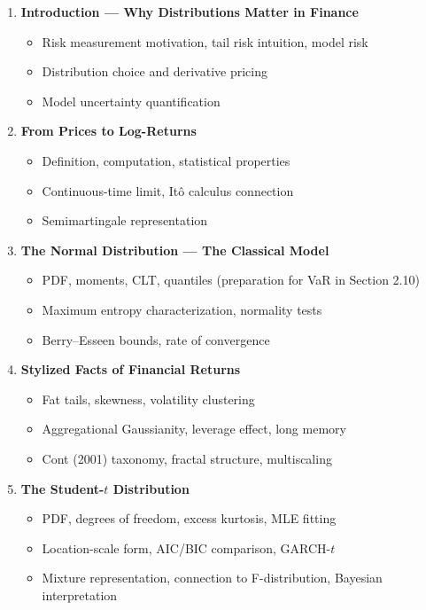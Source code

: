 \documentclass[11pt, a4paper]{article}
\newcommand{\layerY}[1]{\textcolor{MainBlue}{\textbf{[Y3]}} #1}
\newcommand{\layerM}[1]{\textcolor{Forest}{\textbf{[MSc]}} #1}
\newcommand{\layerP}[1]{\textcolor{Purple}{\textbf{[PhD]}} #1}
\theoremstyle{definition}
\begin{document}
\begin{enumerate}[label=\textbf{2.\arabic*}, leftmargin=2cm]

\item \textbf{Introduction — Why Distributions Matter in Finance}
  \begin{itemize}[nosep]
    \item[\layerY{}] Risk measurement motivation, tail risk intuition, model risk
    \item[\layerM{}] Distribution choice and derivative pricing
    \item[\layerP{}] Model uncertainty quantification
  \end{itemize}

\item \textbf{From Prices to Log-Returns}
  \begin{itemize}[nosep]
    \item[\layerY{}] Definition, computation, statistical properties
    \item[\layerM{}] Continuous-time limit, Itô calculus connection
    \item[\layerP{}] Semimartingale representation
  \end{itemize}

\item \textbf{The Normal Distribution — The Classical Model}
  \begin{itemize}[nosep]
    \item[\layerY{}] PDF, moments, CLT, quantiles (preparation for VaR in Section 2.10)
    \item[\layerM{}] Maximum entropy characterization, normality tests
    \item[\layerP{}] Berry--Esseen bounds, rate of convergence
  \end{itemize}

\item \textbf{Stylized Facts of Financial Returns}
  \begin{itemize}[nosep]
    \item[\layerY{}] Fat tails, skewness, volatility clustering
    \item[\layerM{}] Aggregational Gaussianity, leverage effect, long memory
    \item[\layerP{}] Cont (2001) taxonomy, fractal structure, multiscaling
  \end{itemize}

\item \textbf{The Student-$t$ Distribution}
  \begin{itemize}[nosep]
    \item[\layerY{}] PDF, degrees of freedom, excess kurtosis, MLE fitting
    \item[\layerM{}] Location-scale form, AIC/BIC comparison, GARCH-$t$
    \item[\layerP{}] Mixture representation, connection to F-distribution, Bayesian interpretation
  \end{itemize}


\end{enumerate}
\end{document}
